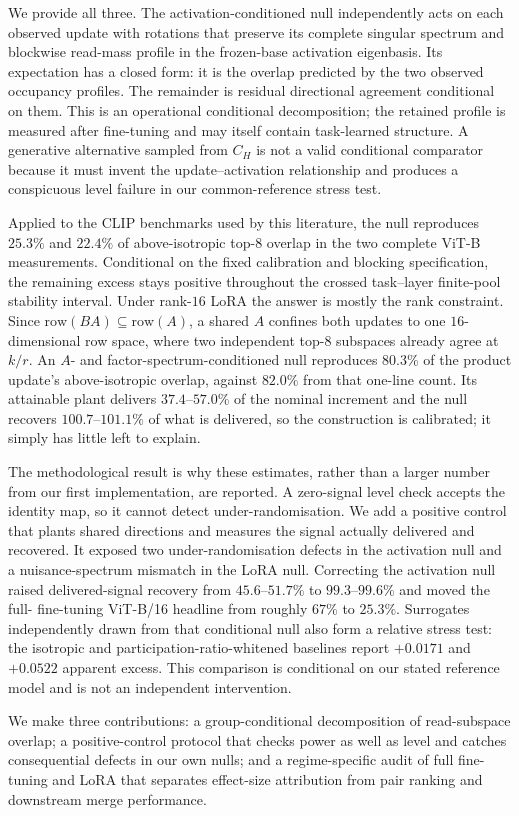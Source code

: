We provide all three. The activation-conditioned null independently acts on each observed update
with rotations that preserve its complete singular spectrum and blockwise read-mass profile in
the frozen-base activation eigenbasis. Its expectation has a closed form: it is the overlap
predicted by the two observed occupancy profiles. The remainder is residual directional
agreement conditional on them. This is an operational conditional decomposition; the retained
profile is measured after fine-tuning and may itself contain task-learned structure. A generative
alternative sampled from $C_H$ is not a valid conditional comparator because it must invent the
update--activation relationship and produces a conspicuous level failure in our
common-reference stress test.

Applied to the CLIP benchmarks used by this literature, the null reproduces $25.3\%$ and $22.4\%$
of above-isotropic top-$8$ overlap in the two complete ViT-B measurements. Conditional on the
fixed calibration and blocking specification, the remaining excess stays positive throughout the
crossed task--layer finite-pool stability interval. Under rank-$16$
LoRA the answer is mostly the rank constraint. Since $\mathrm{row}(BA)\subseteq\mathrm{row}(A)$, a
shared $A$ confines both updates to one $16$-dimensional row space, where two independent top-$8$
subspaces already agree at $k/r$. An $A$- and factor-spectrum-conditioned null reproduces $80.3\%$
of the product update's above-isotropic overlap, against $82.0\%$ from that one-line count. Its
attainable plant delivers $37.4$--$57.0\%$ of the nominal increment and the null recovers
$100.7$--$101.1\%$ of what is delivered, so the construction is calibrated; it simply has little
left to explain.

The methodological result is why these estimates, rather than a larger number from our first
implementation, are reported. A zero-signal level check accepts the identity map, so it cannot
detect under-randomisation. We add a positive control that plants shared directions and measures
the signal actually delivered and recovered. It exposed two under-randomisation defects in the
activation null and a nuisance-spectrum mismatch in the LoRA null. Correcting the activation
null raised delivered-signal recovery from $45.6$--$51.7\%$ to $99.3$--$99.6\%$ and moved the full-
fine-tuning ViT-B/16 headline from roughly $67\%$ to $25.3\%$. Surrogates independently drawn from that conditional
null also form a relative stress test: the isotropic and participation-ratio-whitened baselines
report $+0.0171$ and $+0.0522$ apparent excess. This comparison is conditional on our stated
reference model and is not an independent intervention.

We make three contributions: a group-conditional decomposition of read-subspace overlap; a
positive-control protocol that checks power as well as level and catches consequential defects in
our own nulls; and a regime-specific audit of full fine-tuning and LoRA that separates effect-size
attribution from pair ranking and downstream merge performance.
